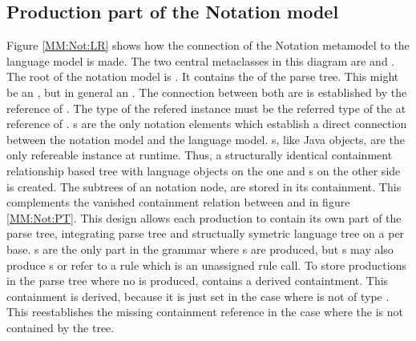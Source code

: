 \subsection{Production part of the Notation model} \label{sec:MM:Not:Prod}
Figure \ref{MM:Not:LR} shows how the connection of the Notation metamodel to the language model is made. The two central metaclasses in this diagram are  and . The root of the notation model is . It contains the  of the parse tree. This might be an , but in general an . The connection between both are is established by the reference  of .  The type of the refered instance must be the referred type of the  at  reference of . s are the only notation elements which establish a direct connection between the notation model and the language model. s, like Java objects, are the only refereable instance at runtime. Thus, a structurally identical containment relationship based tree with language objects on the one and s on the other side is created. The subtrees of an notation node,  are stored in its  containment. This complements the vanished containment relation between  and  in figure \ref{MM:Not:PT}. This design allows each  production to contain its own part of the parse tree, integrating parse tree and structually symetric language tree on a per  base. s are the only part in the grammar where s are produced, but s may also produce s or refer to a rule which is an unassigned rule call. To store productions in the parse tree where no  is produced,  contains a derived  containtment. This containment is derived, because it is just set in the case where  is not of type . This reestablishes the missing containment reference in the case where the  is not contained by the  tree. \\
